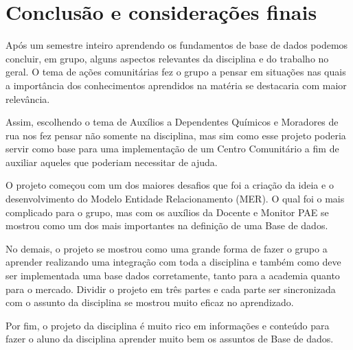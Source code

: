 \section{Conclusão e considerações finais}

Após um semestre inteiro aprendendo os fundamentos de base de dados podemos concluir, em grupo, alguns aspectos relevantes da disciplina e do trabalho no geral. O tema de ações comunitárias fez o grupo a pensar em situações nas quais a importância dos conhecimentos aprendidos na matéria se destacaria com maior relevância. 

Assim, escolhendo o tema de Auxílios a Dependentes Químicos e Moradores de rua nos fez pensar não somente na disciplina, mas sim como esse projeto poderia servir como base para uma implementação de um Centro Comunitário a fim de auxiliar aqueles que poderiam necessitar de ajuda.

O projeto começou com um dos maiores desafios que foi a criação da ideia e o desenvolvimento do Modelo Entidade Relacionamento (MER). O qual foi o mais complicado para o grupo, mas com os auxílios da Docente e Monitor PAE se mostrou como um dos mais importantes na definição de uma Base de dados. 

No demais, o projeto se mostrou como uma grande forma de fazer o grupo a aprender realizando uma integração com toda a disciplina e também como deve ser implementada uma base dados corretamente, tanto para a academia quanto para o mercado. Dividir o projeto em três partes e cada parte ser sincronizada com o assunto da disciplina se mostrou muito eficaz no aprendizado.

Por fim, o projeto da disciplina é muito rico em informações e conteúdo para fazer o aluno da disciplina aprender muito bem os assuntos de Base de dados.


